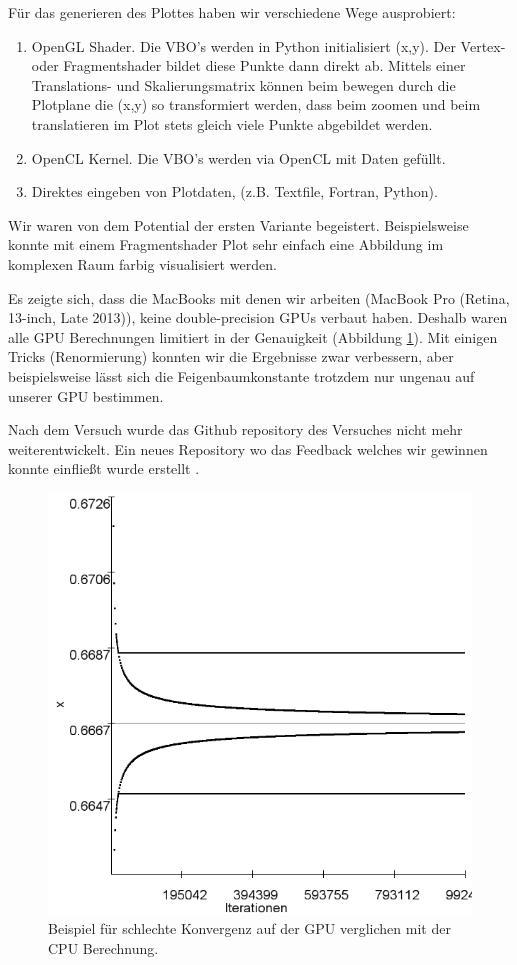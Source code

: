 \documentclass[11,5pt, twoside]{article}
\begin{document}
Für das generieren des Plottes haben wir verschiedene Wege ausprobiert:
\begin{enumerate}
\item OpenGL Shader. Die VBO's werden in Python initialisiert (x,y). Der Vertex- oder Fragmentshader bildet diese Punkte dann direkt ab. Mittels einer Translations- und Skalierungsmatrix können beim bewegen durch die Plotplane die (x,y) so transformiert werden, dass beim zoomen und beim translatieren im Plot stets gleich viele Punkte abgebildet werden. 
\item OpenCL Kernel. Die VBO's werden via OpenCL mit Daten gefüllt. 
\item Direktes eingeben von Plotdaten, (z.B. Textfile, Fortran, Python).
\end{enumerate}
Wir waren von dem Potential der ersten Variante begeistert. Beispielsweise konnte mit einem Fragmentshader Plot sehr einfach eine Abbildung im komplexen Raum farbig visualisiert werden. 

Es zeigte sich, dass die MacBooks mit denen wir arbeiten (MacBook Pro (Retina, 13-inch, Late 2013)), keine double-precision GPUs verbaut haben. Deshalb waren alle GPU Berechnungen limitiert in der Genauigkeit (Abbildung \ref{fig:bsp-opencl}). 
Mit einigen Tricks (Renormierung) konnten wir die Ergebnisse zwar verbessern, aber beispielsweise lässt sich die Feigenbaumkonstante trotzdem nur ungenau auf unserer GPU bestimmen.

Nach dem Versuch wurde das Github repository des Versuches nicht mehr weiterentwickelt. Ein neues Repository wo das Feedback welches wir gewinnen konnte einfließt wurde erstellt \parencite{github-future}. 

\begin{figure}[!htbp]
\centering
\includegraphics[scale=0.25]{log-konv-r3}
\caption{Beispiel für schlechte Konvergenz auf der GPU verglichen mit der CPU Berechnung.}
\label{fig:bsp-opencl}
\end{figure}
\pagebreak
\end{document}
